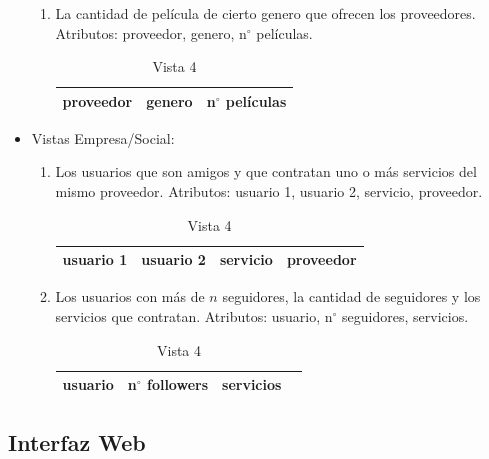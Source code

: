 \documentclass[12pt,letterpaper]{article}
\begin{document}
\begin{itemize}
\begin{enumerate}
		\item La cantidad de película de cierto genero que ofrecen los proveedores. Atributos: proveedor, genero, n$^\circ$ películas.
		
		\begin{table}[ht!]
			\centering
			\begin{tabular}{||c|l|l||} \hline 
				proveedor & genero & n$^\circ$ películas \\ \hline
			\end{tabular}
			\caption {Vista 4}  
		\end{table}		
		
	\end{enumerate}
	
	\item Vistas Empresa/Social:
	
	\begin{enumerate}
		\item Los usuarios que son amigos y que contratan uno o más servicios del mismo proveedor. Atributos: usuario 1, usuario 2, servicio, proveedor.
		
		\begin{table}[ht!]
			\centering
			\begin{tabular}{||c|l|l|l||} \hline 
				usuario 1 & usuario 2 & servicio & proveedor\\ \hline
			\end{tabular}
			\caption {Vista 4}  
		\end{table}
		
		\item Los usuarios con más de $n$ seguidores, la cantidad de seguidores y los servicios que contratan. Atributos: usuario, n$^\circ$ seguidores, servicios.
		
		\begin{table}[ht!]
			\centering
			\begin{tabular}{||c|l|l|l||} \hline 
				usuario & n$^\circ$ followers & servicios \\ \hline
			\end{tabular}
			\caption {Vista 4}  
		\end{table}
		
	\end{enumerate}
	



\end{itemize}


\subsection{Interfaz Web}
\end{document}
